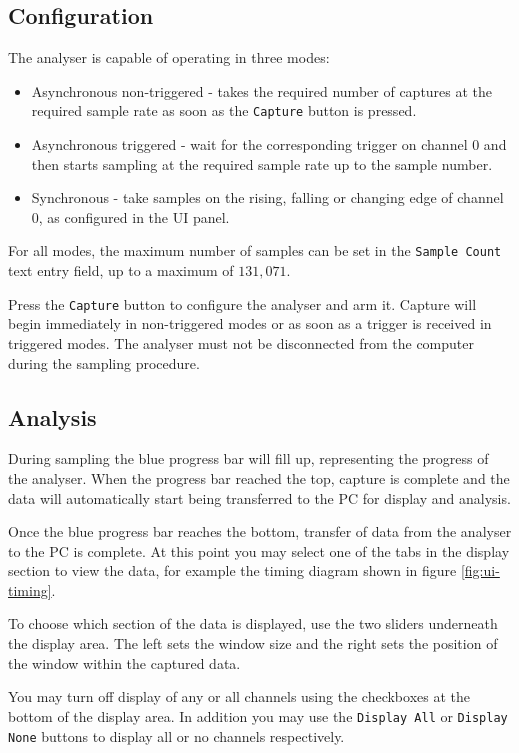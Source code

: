 \documentclass[11pt,twocolumn]{article}
\begin{document}
\subsection{Configuration}
   The analyser is capable of operating in three modes: 
   \begin{itemize}
        \item Asynchronous non-triggered - takes the required number of
            captures at the required sample rate as soon as the
            \texttt{Capture} button is pressed.
        \item Asynchronous triggered - wait for the corresponding trigger on
            channel 0 and then starts sampling at the required sample rate up
            to the sample number.
        \item Synchronous - take samples on the rising, falling or changing
            edge of channel 0, as configured in the UI panel.
    \end{itemize}

    For all modes, the maximum number of samples can be set in the
    \texttt{Sample Count} text entry field, up to a maximum of $131,071$.

    Press the \texttt{Capture} button to configure the analyser and arm it.
    Capture will begin immediately in non-triggered modes or as soon as a
    trigger is received in triggered modes. The analyser must not be
    disconnected from the computer during the sampling procedure.

\subsection{Analysis}
    During sampling the blue progress bar will fill up, representing the
    progress of the analyser. When the progress bar reached the top, capture is
    complete and the data will automatically start being transferred to the PC
    for display and analysis.

    Once the blue progress bar reaches the bottom, transfer of data from the
    analyser to the PC is complete. At this point you may select one of the
    tabs in the display section to view the data, for example the timing
    diagram shown in figure \ref{fig:ui-timing}.

    To choose which section of the data is displayed, use the two sliders 
    underneath the display area. The left sets the window size and the right
    sets the position of the window within the captured data.

    You may turn off display of any or all channels using the checkboxes at the
    bottom of the display area. In addition you may use the \texttt{Display
    All} or \texttt{Display None} buttons to display all or no channels
    respectively.
\end{document}
